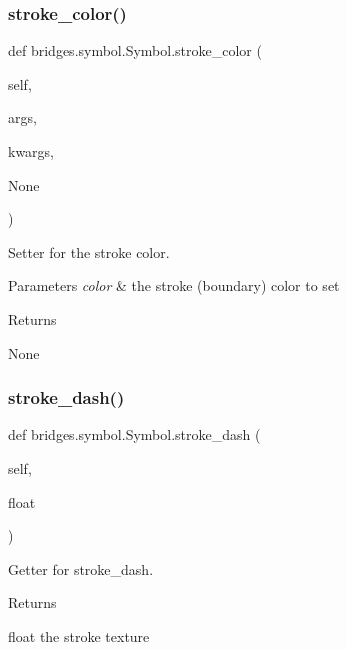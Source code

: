 \subsubsection{\texorpdfstring{stroke\+\_\+color()}{stroke\_color()}\hspace{0.1cm}{\footnotesize\ttfamily [2/2]}}
{\footnotesize\ttfamily def bridges.\+symbol.\+Symbol.\+stroke\+\_\+color (\begin{DoxyParamCaption}\item[{}]{self,  }\item[{}]{args,  }\item[{}]{kwargs,  }\item[{}]{None }\end{DoxyParamCaption})}



Setter for the stroke color. 


\begin{DoxyParams}{Parameters}
{\em color} & the stroke (boundary) color to set \\
\hline
\end{DoxyParams}
\begin{DoxyReturn}{Returns}


None 
\end{DoxyReturn}
\mbox{\label{classbridges_1_1symbol_1_1_symbol_aeb388cf5a368e58ea10ecdd2ad7d3c10}} 
\subsubsection{\texorpdfstring{stroke\+\_\+dash()}{stroke\_dash()}\hspace{0.1cm}{\footnotesize\ttfamily [1/2]}}
{\footnotesize\ttfamily def bridges.\+symbol.\+Symbol.\+stroke\+\_\+dash (\begin{DoxyParamCaption}\item[{}]{self,  }\item[{}]{float }\end{DoxyParamCaption})}



Getter for stroke\+\_\+dash. 

\begin{DoxyReturn}{Returns}


float the stroke texture 
\end{DoxyReturn}
\mbox{\label{classbridges_1_1symbol_1_1_symbol_a1163b25841477c2fda6368fc05f4f79d}} 
